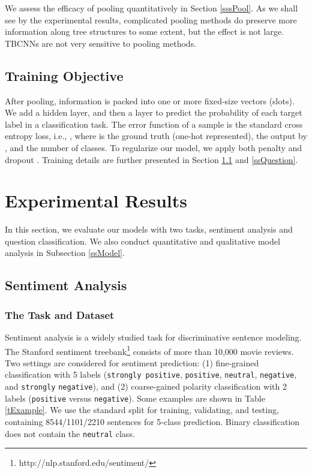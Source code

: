 \documentclass[11pt,a4paper]{article}
\begin{document}
\vspace{-.1cm}

We assess the efficacy of pooling quantitatively in Section \ref{sssPool}.
As we shall see by the experimental results, 
complicated pooling methods do preserve more information along tree structures to some
extent, but the effect is not large. TBCNNs are not very sensitive to pooling methods.
\subsection{Training Objective}\label{ssObjective}

After pooling, information is packed into one or more fixed-size vectors (slots).
We add a hidden layer, and then a 
layer to predict the probability of each target label in a classification task.
The error function of a sample is the standard cross entropy loss, i.e.,
,
where  is the ground truth (one-hot represented),
 the output by , and  the number of classes.
To regularize our model, we apply both  penalty
and dropout \cite{dropout}.
Training details are further presented in Section \ref{ssSentiment} and \ref{ssQuestion}.

\section{Experimental Results}

In this section, we evaluate our models with two tasks,
sentiment analysis and question classification.
We also conduct quantitative and qualitative model analysis
in Subsection \ref{ssModel}.

\subsection{Sentiment Analysis}\label{ssSentiment}


\subsubsection{The Task and Dataset}
Sentiment analysis is a widely studied task for discriminative sentence modeling.
The Stanford sentiment treebank\footnote{http://nlp.stanford.edu/sentiment/} consists of more than 10,000 movie reviews.
Two settings are considered for sentiment prediction:
(1) fine-grained classification with 5 labels
(\verb|strongly positive|, \verb|positive|, \verb|neutral|,
\verb|negative|, and \verb|strongly| \verb|negative|), and
(2) coarse-gained polarity classification with 2 labels (\verb|positive| versus
\verb|negative|).
Some examples are shown in Table \ref{tExample}.
We use the standard split for training, validating, and testing, containing 8544/1101/2210 sentences for 5-class prediction.
Binary classification does not contain the \verb|neutral| class.
\end{document}
